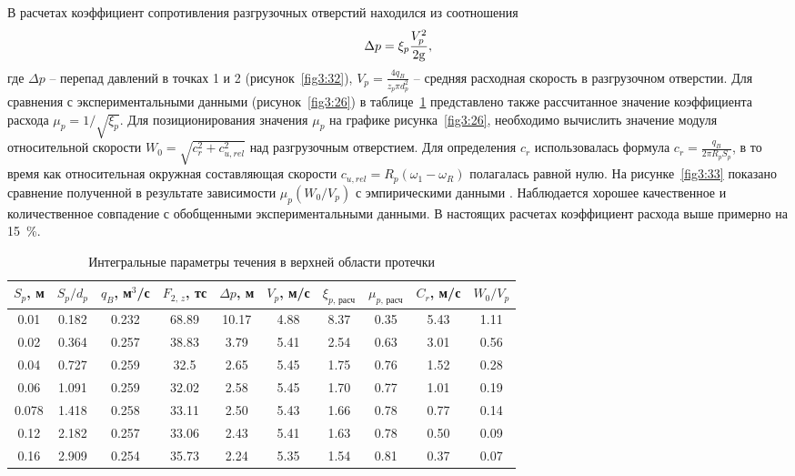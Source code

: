 В расчетах коэффициент сопротивления разгрузочных отверстий находился из соотношения 
\begin{equation}
  \Delta p = \xi _p \frac{{V_p^{\rm{2}} }}{{{\rm{2g}}}},
\end{equation}
где $\Delta p$ -- перепад давлений в точках 1 и 2 
(рисунок~\ref{fig3:32}), $ V_p = \frac{{4q_B}}{{z_p \pi d_p^2 }}$ -- средняя расходная скорость в 
разгрузочном отверстии. Для сравнения с экспериментальными данными (рисунок~\ref{fig3:26}) в таблице~\ref{tab3:4} 
представлено также рассчитанное значение коэффициента расхода $\mu _p  = 1/\sqrt {\xi _p } $. 
Для позиционирования значения $\mu _p$ на графике рисунка~\ref{fig3:26}, необходимо вычислить значение 
модуля относительной скорости $W_0  = \sqrt {c_r^2  + c_{u,rel}^2 }$ над разгрузочным отверстием. 
Для определения $c_r$ использовалась формула $c_r  = \frac{{q_B }}{{2\pi R_p S_p }}$, в то время как 
относительная окружная составляющая скорости $c_{u,rel}  = R_p (\omega _1  - \omega _R )$ полагалась равной 
нулю. На рисунке~\ref{fig3:33} показано сравнение полученной в результате зависимости $\mu _p (W_0 /V_p )$ с 
эмпирическими данными \cite{makar}. Наблюдается хорошее качественное и количественное совпадение с 
обобщенными экспериментальными данными. В настоящих расчетах коэффициент расхода выше примерно на 15~\%. 
\begin{table}[t!]
  \centering\small\caption{Интегральные параметры течения в верхней области протечки}\vspace*{2mm}
  \begin{tabular}{|c|c|c|c|c|c|c|c|c|c|} \hline
  $S_p$, м & $S_p / d_p$ & $q_B$, м$^3$/с & $F_{2,\,z}$, тс & $\Delta p$, м & $V_p$, м/с & 
  $\xi_{p,\,\text{расч}}$ & $\mu_{p,\,\text{расч}}$ & $C_r$, м/с & $W_0/V_p$ \\ \hline
    0.01  & 0.182 & 0.232 & 68.89 & 10.17 & 4.88 & 8.37 & 0.35 & 5.43 & 1.11 \\ %
    0.02  & 0.364 & 0.257 & 38.83 & 3.79  & 5.41 & 2.54 & 0.63 & 3.01 & 0.56 \\ %
    0.04  & 0.727 & 0.259 & 32.5  & 2.65  & 5.45 & 1.75 & 0.76 & 1.52 & 0.28 \\ %
    0.06  & 1.091 & 0.259 & 32.02 & 2.58  & 5.45 & 1.70 & 0.77 & 1.01 & 0.19 \\ %
    0.078 & 1.418 & 0.258 & 33.11 & 2.50  & 5.43 & 1.66 & 0.78 & 0.77 & 0.14 \\ %
    0.12  & 2.182 & 0.257 & 33.06 & 2.43  & 5.41 & 1.63 & 0.78 & 0.50 & 0.09 \\ %
    0.16  & 2.909 & 0.254 & 35.73 & 2.24  & 5.35 & 1.54 & 0.81 & 0.37 & 0.07 \\   \hline
  \end{tabular}
  \label{tab3:4}
\end{table}

